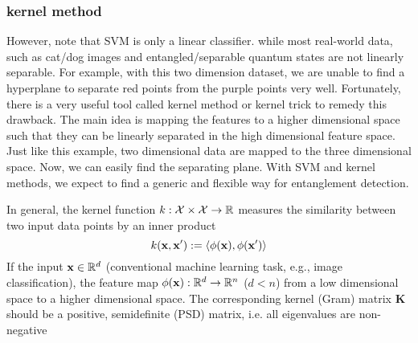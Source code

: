 \subsubsection{kernel method}
However, note that SVM is only a linear classifier. while most real-world data, such as cat/dog images and entangled/separable quantum states are not linearly separable. For example, with this two dimension dataset, we are unable to find a hyperplane to separate red points from the purple points very well. Fortunately, there is a very useful tool called kernel method or kernel trick to remedy this drawback. The main idea is mapping the features to a higher dimensional space such that  they can be linearly separated in the high dimensional feature space. Just like this example, two dimensional data are mapped to the three dimensional space. Now, we can easily find the separating plane. With SVM and kernel methods, we expect to find a generic and flexible way for entanglement detection.
\begin{definition}[kernel]\label{def:kernel}
	In general, the kernel function $k:\mathcal{X}\times \mathcal{X} \to \mathbb{R}$ measures the similarity between two input data points by an inner product
	\begin{equation}
		k (\vb{x},\vb{x}') : = \expval{\phi(\vb{x}),\phi(\vb{x}')}
	\end{equation}
	If the input $\vb{x}\in \mathbb{R}^d$ (conventional machine learning task, e.g., image classification), the feature map $\phi(\vb{x}): \mathbb{R}^d\to \mathbb{R}^n$ ($d < n$) from a low dimensional space to a higher dimensional space.
	The corresponding kernel (Gram) matrix $\mathbf{K}$ should be a positive, semidefinite (PSD) matrix, i.e. all eigenvalues are non-negative
\end{definition}
